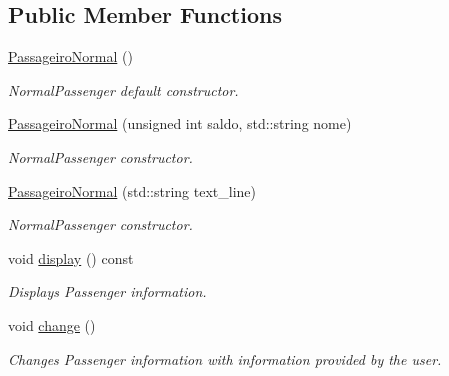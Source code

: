 \subsection*{Public Member Functions}
\begin{DoxyCompactItemize}
\item 
\mbox{\label{class_passageiro_normal_a6db45ff29a6daf9d4c01158e654f8780}} 
\hyperlink{class_passageiro_normal_a6db45ff29a6daf9d4c01158e654f8780}{Passageiro\+Normal} ()
\begin{DoxyCompactList}\small\item\em Normal\+Passenger default constructor. \end{DoxyCompactList}\item 
\hyperlink{class_passageiro_normal_a613fd301fc3f71910aa20d4d02b48222}{Passageiro\+Normal} (unsigned int saldo, std\+::string nome)
\begin{DoxyCompactList}\small\item\em Normal\+Passenger constructor. \end{DoxyCompactList}\item 
\hyperlink{class_passageiro_normal_a21a6239c0fea57fc7cc3e08248a4b287}{Passageiro\+Normal} (std\+::string text\+\_\+line)
\begin{DoxyCompactList}\small\item\em Normal\+Passenger constructor. \end{DoxyCompactList}\item 
\mbox{\label{class_passageiro_normal_af9084b425096092168300f05959dc4bf}} 
void \hyperlink{class_passageiro_normal_af9084b425096092168300f05959dc4bf}{display} () const
\begin{DoxyCompactList}\small\item\em Displays Passenger information. \end{DoxyCompactList}\item 
\mbox{\label{class_passageiro_normal_a0e8bb38b9a15acff1b8e2ab1b2fb2dfe}} 
void \hyperlink{class_passageiro_normal_a0e8bb38b9a15acff1b8e2ab1b2fb2dfe}{change} ()
\begin{DoxyCompactList}\small\item\em Changes Passenger information with information provided by the user. \end{DoxyCompactList}\item 

\end{DoxyCompactItemize}
